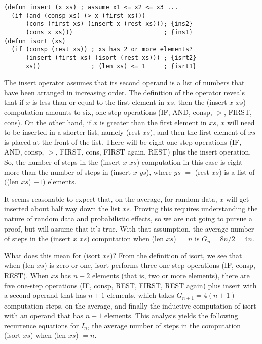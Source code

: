 \label{defun:insert-isort}\label{defun:isort}
\begin{Verbatim}
(defun insert (x xs) ; assume x1 <= x2 <= x3 ...
  (if (and (consp xs) (> x (first xs)))
      (cons (first xs) (insert x (rest xs))); {ins2}
      (cons x xs)))                         ; {ins1}
(defun isort (xs)
  (if (consp (rest xs)) ; xs has 2 or more elements?
      (insert (first xs) (isort (rest xs))) ; {isrt2}
      xs))              ; (len xs) <= 1     ; {isrt1}
\end{Verbatim}

The insert operator assumes that its second operand
is a list of numbers that have been arranged in increasing order.
The definition of the operator reveals that
if $x$ is less than or equal to the first element in $xs$,
then the  (insert $x$ $xs$)
computation amounts to six, one-step operations
(IF, AND, consp, $>$, FIRST, cons).
On the other hand, if $x$ is greater than the first
element in $xs$,
$x$ will need to be inserted in a shorter list,
namely (rest $xs$), and then the first element of $xs$
is placed at the front of the list.
There will be eight one-step operations
(IF, AND, consp, $>$, FIRST, cons, FIRST again, REST)
plus the insert operation.
So, the number of steps in the (insert $x$ $xs$)
computation in this case is eight more than the number of
steps in (insert $x$ $ys$), where $ys$ $=$ (rest $xs$)
is a list of $($(len $xs$) $- 1)$ elements.

It seems reasonable to expect that, on the average,
for random data, $x$ will get inserted about
half way down the list $xs$.
Proving this requires understanding the nature of random
data and probabilistic effects, so we are not going
to pursue a proof, but will assume that it's true.
With that assumption, the average
number of steps in the (insert $x$ $xs$) computation 
when (len $xs$) $= n$ is
$G_n = 8n/2 = 4n$.

What does this mean for (isort $xs$)?
From the definition of isort, we see that when (len $xs$) is zero or one,
isort performs three one-step operations (IF, consp, REST).
When $xs$ has $n+2$ elements (that is, two or more elements),
there are five one-step operations
(IF, consp, REST, FIRST, REST again)
plus insert with a second operand that has $n+1$ elements,
which takes $G_{n+1} = 4(n+1)$ computation steps,
on the average, and finally the inductive computation of isort
with an operand that has $n+1$ elements.
This analysis yields the following recurrence equations for $I_n$,
the average number of steps in the computation (isort $xs$) when (len $xs$) $= n$.

